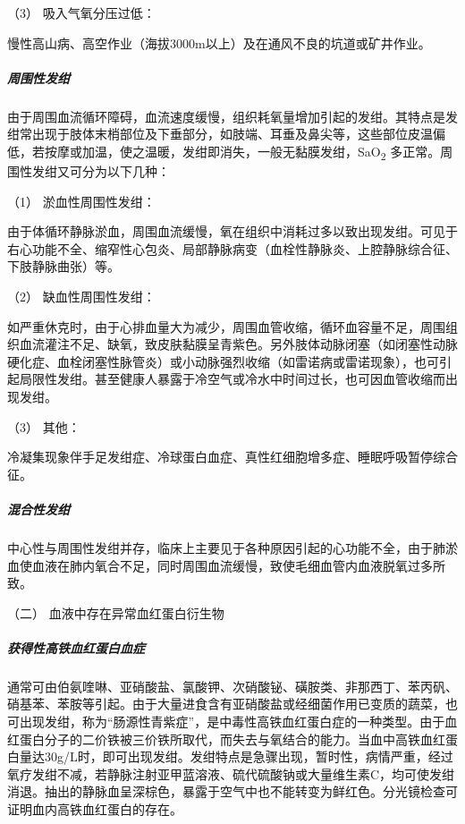 \hypertarget{text00041.htmlux5cux23CHP1-17-1-1-1-3}{}
（3） 吸入气氧分压过低：

慢性高山病、高空作业（海拔3000m以上）及在通风不良的坑道或矿井作业。

\subparagraph{周围性发绀}

由于周围血流循环障碍，血流速度缓慢，组织耗氧量增加引起的发绀。其特点是发绀常出现于肢体末梢部位及下垂部分，如肢端、耳垂及鼻尖等，这些部位皮温偏低，若按摩或加温，使之温暖，发绀即消失，一般无黏膜发绀，SaO\textsubscript{2}
多正常。周围性发绀又可分为以下几种：

\hypertarget{text00041.htmlux5cux23CHP1-17-1-1-2-1}{}
（1） 淤血性周围性发绀：

由于体循环静脉淤血，周围血流缓慢，氧在组织中消耗过多以致出现发绀。可见于右心功能不全、缩窄性心包炎、局部静脉病变（血栓性静脉炎、上腔静脉综合征、下肢静脉曲张）等。

\hypertarget{text00041.htmlux5cux23CHP1-17-1-1-2-2}{}
（2） 缺血性周围性发绀：

如严重休克时，由于心排血量大为减少，周围血管收缩，循环血容量不足，周围组织血流灌注不足、缺氧，致皮肤黏膜呈青紫色。另外肢体动脉闭塞（如闭塞性动脉硬化症、血栓闭塞性脉管炎）或小动脉强烈收缩（如雷诺病或雷诺现象），也可引起局限性发绀。甚至健康人暴露于冷空气或冷水中时间过长，也可因血管收缩而出现发绀。

\hypertarget{text00041.htmlux5cux23CHP1-17-1-1-2-3}{}
（3） 其他：

冷凝集现象伴手足发绀症、冷球蛋白血症、真性红细胞增多症、睡眠呼吸暂停综合征。

\subparagraph{混合性发绀}

中心性与周围性发绀并存，临床上主要见于各种原因引起的心功能不全，由于肺淤血使血液在肺内氧合不足，同时周围血流缓慢，致使毛细血管内血液脱氧过多所致。

\hypertarget{text00041.htmlux5cux23CHP1-17-1-2}{}
（二） 血液中存在异常血红蛋白衍生物

\subparagraph{获得性高铁血红蛋白血症}

通常可由伯氨喹啉、亚硝酸盐、氯酸钾、次硝酸铋、磺胺类、非那西丁、苯丙矾、硝基苯、苯胺等引起。由于大量进食含有亚硝酸盐或经细菌作用已变质的蔬菜，也可出现发绀，称为“肠源性青紫症”，是中毒性高铁血红蛋白症的一种类型。由于血红蛋白分子的二价铁被三价铁所取代，而失去与氧结合的能力。当血中高铁血红蛋白量达30g/L时，即可出现发绀。发绀特点是急骤出现，暂时性，病情严重，经过氧疗发绀不减，若静脉注射亚甲蓝溶液、硫代硫酸钠或大量维生素C，均可使发绀消退。抽出的静脉血呈深棕色，暴露于空气中也不能转变为鲜红色。分光镜检查可证明血内高铁血红蛋白的存在。

